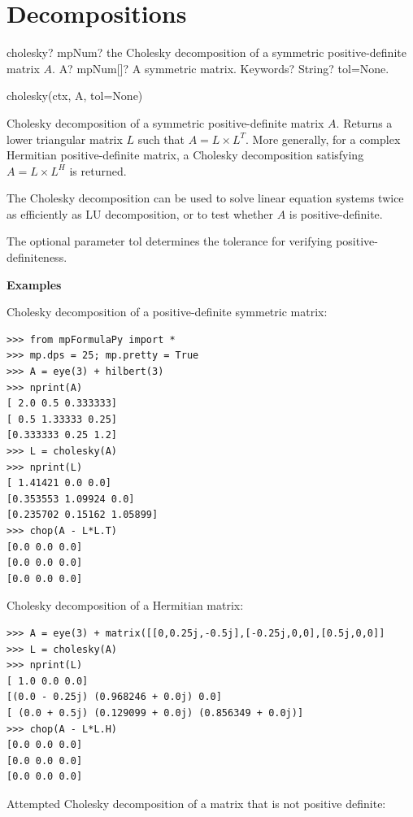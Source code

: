 \newpage
\section{Decompositions}


\begin{mpFunctionsExtract}
	\mpFunctionTwo
	{cholesky? mpNum? the Cholesky decomposition of a symmetric positive-definite matrix $A$.}
	{A? mpNum[]? A symmetric matrix.}
	{Keywords? String?  tol=None.}
\end{mpFunctionsExtract}


cholesky(ctx, A, tol=None)

Cholesky decomposition of a symmetric positive-definite matrix $A$. Returns a lower triangular matrix $L$ such that $A=L \times L^T$. More generally, for a complex Hermitian positive-definite matrix, a Cholesky decomposition satisfying $A=L \times L^H$ is returned.

\vpara
The Cholesky decomposition can be used to solve linear equation systems twice as efficiently as LU decomposition, or to test whether $A$ is positive-definite.

\vpara
The optional parameter tol determines the tolerance for verifying positive-definiteness.

\vpara
\textbf{Examples}

Cholesky decomposition of a positive-definite symmetric matrix:

\begin{lstlisting}
>>> from mpFormulaPy import *
>>> mp.dps = 25; mp.pretty = True
>>> A = eye(3) + hilbert(3)
>>> nprint(A)
[ 2.0 0.5 0.333333]
[ 0.5 1.33333 0.25]
[0.333333 0.25 1.2]
>>> L = cholesky(A)
>>> nprint(L)
[ 1.41421 0.0 0.0]
[0.353553 1.09924 0.0]
[0.235702 0.15162 1.05899]
>>> chop(A - L*L.T)
[0.0 0.0 0.0]
[0.0 0.0 0.0]
[0.0 0.0 0.0]
\end{lstlisting}

Cholesky decomposition of a Hermitian matrix:

\begin{lstlisting}
>>> A = eye(3) + matrix([[0,0.25j,-0.5j],[-0.25j,0,0],[0.5j,0,0]]
>>> L = cholesky(A)
>>> nprint(L)
[ 1.0 0.0 0.0]
[(0.0 - 0.25j) (0.968246 + 0.0j) 0.0]
[ (0.0 + 0.5j) (0.129099 + 0.0j) (0.856349 + 0.0j)]
>>> chop(A - L*L.H)
[0.0 0.0 0.0]
[0.0 0.0 0.0]
[0.0 0.0 0.0]
\end{lstlisting}

Attempted Cholesky decomposition of a matrix that is not positive definite:

